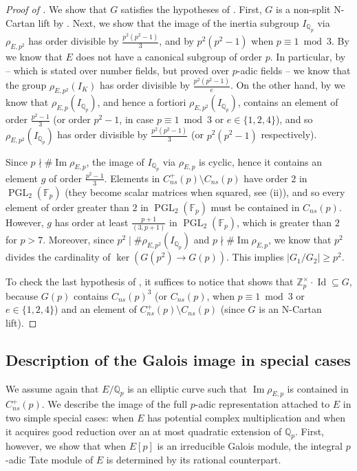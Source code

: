 \documentclass{amsart}
\newcommand{\op}[1]{\operatorname{#1}}
\newcommand{\Qp}{\mathbb{Q}_p}
\theoremstyle{definition}
\newcommand{\Z}{\mathbb{Z}}
\newcommand{\Q}{\mathbb{Q}}
\newcommand{\F}{\mathbb{F}}
\newcommand{\NRep}[1]{\operatorname{Im}\rho_{E,#1}}
\numberwithin{theorem}{section}
\numberwithin{equation}{section}
\begin{document}
\begin{proof}[Proof of ]
    We show that $G$ satisfies the hypotheses of .
    First, $G$ is a non-split N-Cartan lift by .
    Next, we show that the image of the inertia subgroup $I_{\Qp}$ via $\rho_{E,p^2}$ has order divisible by $\frac{p^2(p^2-1)}{3}$, and by $p^2(p^2-1)$ when $p \equiv 1 \bmod 3$.
    By  we know that $E$ does not have a canonical subgroup of order $p$. In particular, by \cite[Theorem 4.6]{smith23} -- which is stated over number fields, but proved over $p$-adic fields -- we know that the group $\rho_{E,p^2}(I_K)$ has order divisible by $\frac{p^2(p^2-1)}{e}$. On the other hand, by  we know that $\rho_{E,p}(I_{\Qp})$, and hence a fortiori 
    $\rho_{E,p^2}(I_{\Qp})$, contains an element of order $\frac{p^2-1}{3}$ (or order $p^2-1$, in case $p \equiv 1 \bmod 3$ or $e \in \{1,2,4\}$), and so $\rho_{E,p^2}(I_{\Qp})$ has order divisible by $\frac{p^2(p^2-1)}{3}$ (or $p^2(p^2-1)$ respectively).
    
    Since $p \nmid \#\NRep{p}$, the image of $I_{\Qp}$ via $\rho_{E,p}$ is cyclic, hence it contains an element $g$ of order $\frac{p^2-1}{3}$. Elements in $C_{ns}^+(p) \setminus C_{ns}(p)$ have order $2$ in $\operatorname{PGL}_2(\F_p)$ (they become scalar matrices when squared, see (ii)), and so every element of order greater than $2$ in $\operatorname{PGL}_2(\F_p)$ must be contained in $C_{ns}(p)$. However, $g$ has order at least $\frac{p+1}{(3,p+1)}$ in $\operatorname{PGL}_2(\F_p)$, which is greater than $2$ for $p>7$. Moreover, since $p^2 \mid \#\rho_{E,p^2}(I_{\Qp})$ and $p \nmid \#\NRep{p}$, we know that $p^2$ divides the cardinality of $\ker(G(p^2) \to G(p))$. This implies $|G_1/G_2| \ge p^2$.
    
    To check the last hypothesis of , it suffices to notice that \cite[Corollary 3.7]{lombardotronto22} shows that $\Z_p^\times \cdot \op{Id} \subseteq G$, because $G(p)$ contains $C_{ns}(p)^3$ (or $C_{ns}(p)$, when $p \equiv 1 \bmod 3$ or $e \in \{1,2,4\}$) and an element of $C_{ns}^+(p) \setminus C_{ns}(p)$ (since $G$ is an N-Cartan lift).
\end{proof}

\subsection{Description of the Galois image in special cases}
We assume again that $E/\Q_p$ is an elliptic curve such that $\operatorname{Im} \rho_{E,p}$ is contained in $C_{ns}^+(p)$. We describe the image of the full $p$-adic representation attached to $E$ in two simple special cases: when $E$ has potential complex multiplication and when it acquires good reduction over an at most quadratic extension of $\Q_p$. First, however, we show that when $E[p]$ is an irreducible Galois module, the integral $p$-adic Tate module of $E$ is determined by its rational counterpart.
\end{document}
